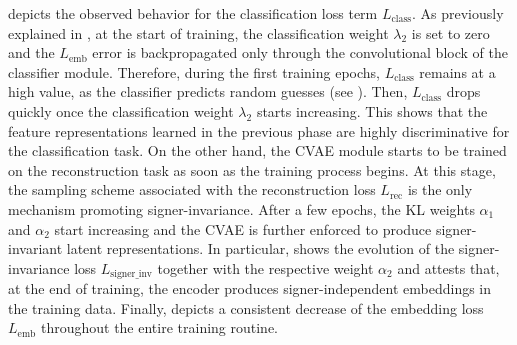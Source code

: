  depicts the observed behavior for the classification loss term $L_{\text{class}}$. As previously explained in , at the start of training, the classification weight $\lambda_{2}$ is set to zero and the $L_{\text{emb}}$ error is backpropagated only through the convolutional block of the classifier module. Therefore, during the first training epochs, $L_{\text{class}}$ remains at a high value, as the classifier predicts random guesses (see ). Then, $L_{\text{class}}$ drops quickly once the classification weight $\lambda_{2}$ starts increasing. This shows that the feature representations learned in the previous phase are highly discriminative for the classification task. On the other hand, the CVAE module starts to be trained on the reconstruction task as soon as the training process begins. At this stage, the sampling scheme associated with the reconstruction loss $L_{\text{rec}}$ is the only mechanism promoting signer-invariance. After a few epochs, the KL weights $\alpha_1$ and $\alpha_2$ start increasing and the CVAE is further enforced to produce signer-invariant latent representations. In particular,  shows the evolution of the signer-invariance loss $L_{\text{signer\_inv}}$ together with the respective weight $\alpha_2$ and attests that, at the end of training, the encoder produces signer-independent embeddings in the training data. Finally,  depicts a consistent decrease of the embedding loss $L_{\text{emb}}$ throughout the entire training routine.

